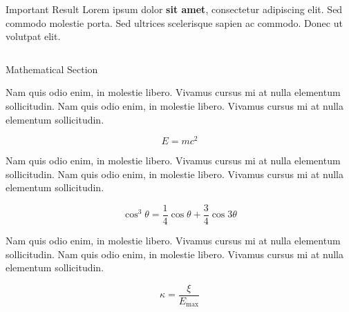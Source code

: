 \documentclass[final]{beamer}
\newlength{\onecolwid}
\newlength{\twocolwid}
\begin{document}
\begin{frame}[t]
\begin{columns}[t]
\begin{column}{\twocolwid}
\begin{alertblock}{Important Result}
				Lorem ipsum dolor \textbf{sit amet}, consectetur adipiscing elit. Sed commodo molestie porta. Sed ultrices scelerisque sapien ac commodo. Donec ut volutpat elit.
				
			\end{alertblock} 
			
			
			\begin{columns}[t,totalwidth=\twocolwid] %
				
				\begin{column}{\onecolwid} %
					
					
					\begin{block}{Mathematical Section}
						
						Nam quis odio enim, in molestie libero. Vivamus cursus mi at nulla elementum sollicitudin. Nam quis odio enim, in molestie libero. Vivamus cursus mi at nulla elementum sollicitudin.
						
						\begin{equation}
						E = mc^{2}
						\label{eqn:Einstein}
						\end{equation}
						
						Nam quis odio enim, in molestie libero. Vivamus cursus mi at nulla elementum sollicitudin. Nam quis odio enim, in molestie libero. Vivamus cursus mi at nulla elementum sollicitudin.
						
						\begin{equation}
						\cos^3 \theta =\frac{1}{4}\cos\theta+\frac{3}{4}\cos 3\theta
						\label{eq:refname}
						\end{equation}
						
						Nam quis odio enim, in molestie libero. Vivamus cursus mi at nulla elementum sollicitudin. Nam quis odio enim, in molestie libero. Vivamus cursus mi at nulla elementum sollicitudin.
						
						\begin{equation}
						\kappa =\frac{\xi}{E_{\mathrm{max}}} %
						\end{equation}
						
					\end{block}
					

\end{column}
\end{columns}
\end{column}
\end{columns}
\end{frame}
\end{document}
